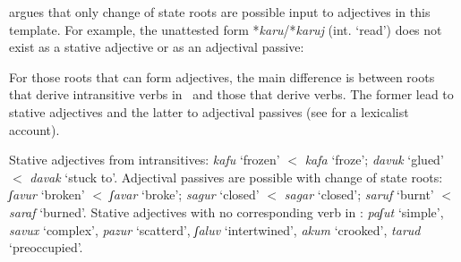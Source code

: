 \begin{exe}
\begin{xlist}
\begin{exe}
\begin{xlist}
\begin{exe}
\begin{exe}
\begin{xlist}
\begin{exe}
\begin{exe}
\begin{xlist}
\begin{exe}
\begin{xlist}
\begin{exe}
\begin{xlist}
\begin{exe}
\begin{xlist}
\begin{xlist}
\begin{exe}
\begin{xlist}
\begin{exe}
\begin{xlist}
\begin{exe}
\begin{exe}
\begin{exe}
\begin{xlist}
\begin{exe}
\begin{exe}
\begin{xlist}
\begin{exe}
\begin{xlist}
\begin{exe}
\begin{xlist}
\begin{exe}
\begin{xlist}
\begin{xlist}
\begin{exe}
\begin{xlist}
\begin{exe}
\begin{xlist}
\begin{exe}
\begin{xlist}
\begin{exe}
\begin{xlist}
\begin{exe}
\begin{exe}
\begin{exe}
\begin{exe}
\begin{exe}
\begin{xlist}
\begin{xlist}
\begin{exe}
\begin{xlist}
\begin{exe}
\begin{xlist}
\begin{exe}
\cite{doron00} argues that only change of state roots are possible input to adjectives in this template. For example, the unattested form *\emph{karu}/*\emph{karuj} (int. `read') does not exist as a stative adjective or as an adjectival passive:
 \begin{exe}
  
 \z 

For those roots that can form adjectives, the main difference is between roots that derive intransitive verbs in \tkal~and those that derive  verbs. The former lead to stative adjectives and the latter to adjectival passives (see \citealt{meltzerasscher11} for a lexicalist account).
 \begin{exe}
 \ex   \label{ex:5n49}
 \begin{xlist} 
   \ex  Stative adjectives from intransitives: \emph{kafu} `frozen' $<$ \emph{kafa} `froze'; \emph{davuk} `glued' $<$ \emph{davak} `stuck to'.  
   \ex  Adjectival passives are possible with change of state roots: \emph{ʃavur} `broken' $<$ \emph{ʃavar} `broke'; \emph{sagur} `closed' $<$ \emph{sagar} `closed'; \emph{saruf} `burnt' $<$ \emph{saraf} `burned'.  
   \ex  Stative adjectives with no corresponding verb in \tkal: \emph{paʃut} `simple', \emph{savux} `complex', \emph{pazur} `scatterd', \emph{ʃaluv} `intertwined', \emph{akum} `crooked', \emph{tarud} `preoccupied'. 
   \z
\z 

\end{xlist}
\end{exe}
\end{exe}
\end{exe}
\end{xlist}
\end{exe}
\end{xlist}
\end{exe}
\end{xlist}
\end{xlist}
\end{exe}
\end{exe}
\end{exe}
\end{exe}
\end{exe}
\end{xlist}
\end{exe}
\end{xlist}
\end{exe}
\end{xlist}
\end{exe}
\end{xlist}
\end{exe}
\end{xlist}
\end{xlist}
\end{exe}
\end{xlist}
\end{exe}
\end{xlist}
\end{exe}
\end{xlist}
\end{exe}
\end{exe}
\end{xlist}
\end{exe}
\end{exe}
\end{exe}
\end{xlist}
\end{exe}
\end{xlist}
\end{exe}
\end{xlist}
\end{xlist}
\end{exe}
\end{xlist}
\end{exe}
\end{xlist}
\end{exe}
\end{xlist}
\end{exe}
\end{exe}
\end{xlist}
\end{exe}
\end{exe}
\end{xlist}
\end{exe}
\end{xlist}
\end{exe}
